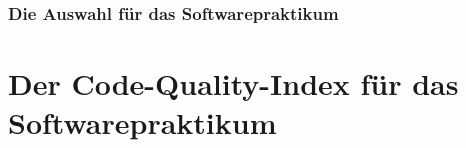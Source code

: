 \documentclass[da,ngerman]{stthesis}
\begin{document}
			\subsection{Die Auswahl für das Softwarepraktikum}
				
	\chapter{Der Code-Quality-Index für das Softwarepraktikum} \label{indexchapter}
  	\backmatter
  
  	\appendix
  	
  
\end{document}
